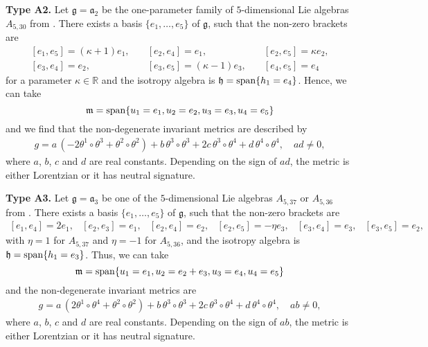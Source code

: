 \documentclass{amsart}
\theoremstyle{plain}
\theoremstyle{remark}
\def\R{\mathbb{R}}
\newcommand\A{{\mathfrak{a}}}
\newcommand\g{{\mathfrak{g}}}
\newcommand\h{{\mathfrak{h}}}
\newcommand\m{{\mathfrak{m}}}
\begin{document}
\medskip\noindent
{\bf Type A2.} Let $\g =\A _2$ be the one-parameter family of $5$-dimensional Lie algebras $A_{5,30}$ from \cite{PSW}. There exists a basis $\{e_1,\ldots,e_5\}$ of $\g$, such that the non-zero brackets are
\[
\begin{array}{lll}
[e_1,e_5]=(\kappa+1)e_1, \quad & [e_2,e_4]=e_1, \quad & [e_2,e_5]=\kappa e_2, \\[2 pt]
[e_3,e_4]=e_2, \quad & [e_3,e_5]=(\kappa-1) e_3, \quad  & [e_4,e_5]=e_4
\end{array}
\]
for a parameter $\kappa \in \R$ and the isotropy algebra is $\h={\rm span}\{h_1=e_4\}$. Hence, we can take
\begin{equation}\label{eq:mA2}
\m={\rm span}\{u_1=e_1,u_2=e_2,u_3=e_3,u_4=e_5\}
\end{equation}
and we find that the non-degenerate invariant metrics are described by
%
\begin{equation}\label{gA2}
\begin{array}{l} g=a\, \left(-2\theta^1 \circ \theta^3+\theta^2 \circ \theta^2 \right)+b\, \theta^3 \circ \theta^3 +2c\, \theta^3 \circ \theta^4 +d\, \theta^4 \circ \theta^4, \quad ad \neq 0,
\end{array}
\end{equation}
where $a$, $b$, $c$ and $d$ are real constants. Depending on the sign of
 $ad$, the metric is either Lorentzian or it has neutral signature.

\medskip\noindent
{\bf Type A3.} Let $\g=\A _3$ be one of the $5$-dimensional Lie algebras $A_{5,37}$ or $A_{5,36}$ from \cite{PSW}. There exists a basis $\{e_1,\ldots,e_5\}$ of $\g$, such that the non-zero brackets are
\[
\begin{array}{llllll}
[e_1,e_4]=2e_1, & [e_2,e_3]=e_1, & [e_2,e_4]=e_2,  &
[e_2,e_5]=-\eta e_3,  & [e_3,e_4]=e_3, & [e_3,e_5]=e_2 ,
\end{array}
\]
with $\eta =1$ for $A_{5,37}$ and $\eta =-1$ for $A_{5,36}$, and the isotropy algebra is $\h={\rm span}\{h_1=e_3\}$. Thus, we can take
\begin{equation}\label{eq:mA3}
\m={\rm span}\{u_1=e_1,u_2=e_2+e_3,u_3=e_4,u_4=e_5\}
\end{equation}
and the non-degenerate invariant metrics are
\begin{equation}\label{gA3}
\begin{array}{l} g=a\, \left(2\theta^1 \circ \theta^4+\theta^2 \circ \theta^2 \right)+b\, \theta^3 \circ \theta^3 +2c\, \theta^3 \circ \theta^4 +d\, \theta^4 \circ \theta^4, \quad ab \neq 0,
\end{array}
\end{equation}
where $a$, $b$, $c$ and $d$ are real constants. Depending on the sign of
 $ab$, the metric is either Lorentzian or it has neutral signature.
\end{document}
